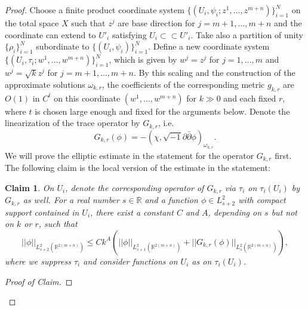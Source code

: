 \documentclass{amsart}
\numberwithin{equation}{section}
\theoremstyle{plain}
\newtheorem*{claim*}{Claim}
\theoremstyle{definition}
\theoremstyle{remark}
\begin{document}
\begin{proof}
Choose a finite product coordinate system $\{(U_i,\psi_i; z^1, \dots , z^{m+n})\}^N_{i=1}$ on the total space $X$ such that $z^j$ are base direction for $j=m+1, \dots, m+n$ and the coordinate can extend to $U'_i$ satisfying $U_i \subset \subset U'_i$.
Take also a partition of unity $\{ \rho_i \}^N_{i=1}$ subordinate to 
$\{(U_i,\psi_i)\}^N_{i=1}$. Define a new coordinate system $\{ (U_i, \tau_i; w^1,\dots, w^{m+n}) \}^N_{i=1}$, which is given by $w^j=z^j$ for $j=1, \dots, m$ and $w^j= \sqrt{k} z^j$ for $j=m+1, \dots, m+n$. By this scaling and the construction of the approximate solutions $\omega_{k,r}$, the coefficients of the corresponding metric $g_{k,r}$ are $O(1)$ in $C^t$ on this coordinate $(w^1, \dots, w^{m+n})$ for $k \gg 0$ and each fixed $r$, where $t$ is chosen large enough and fixed for the arguments below.  Denote the linearization of the trace operator by $G_{k,r}$, i.e. 
$$G_{k,r}(\phi) = - \left( \chi, \sqrt{-1} \partial\bar{\partial} \phi \right)_{\omega_{k,r}}.$$
We will prove the elliptic estimate in the statement for the operator $G_{k,r}$ first. The following claim is the local version of the estimate in the statement:
\begin{claim*}
On $U_i$, denote the corresponding operator of $G_{k,r}$ via $\tau_i$ on $\tau_i(U_i)$ by $G_{k,r}$ as well. For a real number $s \in \mathbb{R}$ and a function $\phi \in L^2_{s+2}$ with compact support contained in $U_i$, there exist a constant $C$ and $A$, depending on $s$ but not on $k$ or $r$, such that 
$$ ||\phi||_{L^2_{s+2}(\mathbb{R}^{2(m+n)})} \le C k^A \left( ||\phi||_{L^2_{s+1}(\mathbb{R}^{2(m+n)})} + ||G_{k,r}(\phi)||_{L^2_s(\mathbb{R}^{2(m+n)})} \right),$$
where we suppress $\tau_i$ and consider functions on $U_i$ as on $\tau_i(U_i)$.
\end{claim*}
\begin{proof}[Proof of Claim]%


\end{proof}
\end{proof}
\end{document}
